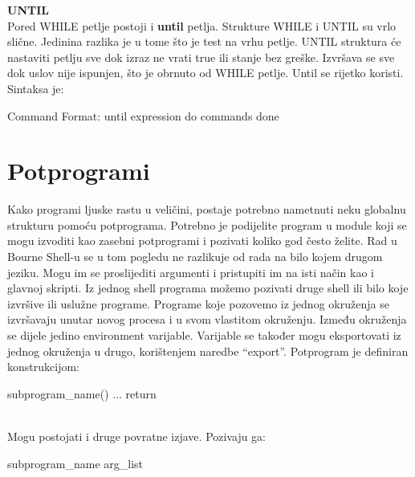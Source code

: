 \documentclass[11pt]{book}
\begin{document}
\textbf{UNTIL}\\

Pored WHILE petlje postoji i \textbf{until} petlja. Strukture WHILE i UNTIL  su vrlo slične. Jedinina razlika je u tome što je test na vrhu petlje. UNTIL struktura će nastaviti petlju sve dok izraz ne vrati true ili stanje bez greške. Izvršava se sve dok uslov nije ispunjen, što je obrnuto od WHILE petlje. Until se rijetko koristi.\\

Sintaksa je:\\

\begin{shortlisting}
Command Format:  until expression
                        do
                        commands
                        done

\end{shortlisting}

\section{Potprogrami}
Kako programi ljuske rastu u veličini, postaje potrebno nametnuti neku globalnu strukturu pomoću potprograma. Potrebno je podijelite program u module koji se mogu izvoditi kao zasebni potprogrami i pozivati koliko god često želite. Rad u Bourne Shell-u se u tom pogledu ne razlikuje od rada na bilo kojem drugom jeziku. Mogu im se proslijediti argumenti i pristupiti im na isti način kao i glavnoj skripti. 
Iz jednog shell programa možemo pozivati druge shell ili bilo koje izvršive ili uslužne programe. Programe koje pozovemo iz jednog okruženja se izvršavaju unutar novog procesa i u svom vlastitom okruženju. Između okruženja se dijele jedino environment varijable. Varijable se također mogu eksportovati iz jednog okruženja u drugo, korištenjem naredbe “export”.
Potprogram je definiran konstrukcijom:\\

\begin{shortlisting}
subprogram_name() {
 ...
 return
}
\end{shortlisting}\\

Mogu postojati i druge povratne izjave. Pozivaju ga:\\

\begin{shortlisting}
subprogram_name arg_list
\end{shortlisting}\\
\end{document}
